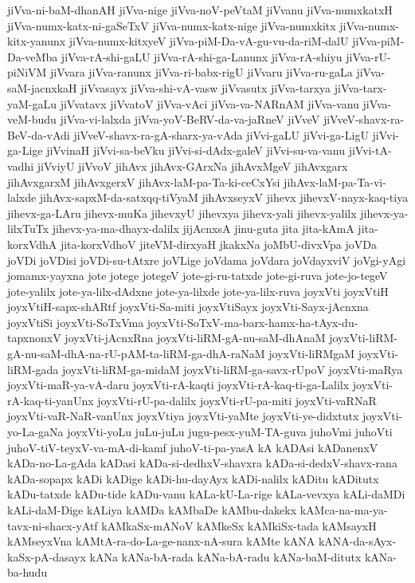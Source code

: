 {jiVva-ni-baM-dhanAH
jiVva-nige
jiVva-noV-peVtaM
jiVvanu
jiVva-numxkatxH
jiVva-numx-katx-ni-gaSeTxV
jiVva-numx-katx-nige
jiVva-numxkitx
jiVva-numx-kitx-yanunx
jiVva-numx-kitxyeV
jiVva-piM-Da-vA-gu-vu-da-riM-dalU
jiVva-piM-Da-veMba
jiVva-rA-shi-gaLU
jiVva-rA-shi-ga-Lanunx
jiVva-rA-shiyu
jiVva-rU-piNiVM
jiVvara
jiVva-ranunx
jiVva-ri-babx-rigU
jiVvaru
jiVva-ru-gaLa
jiVva-saM-jacnxkaH
jiVvasayx
jiVva-shi-vA-vasw
jiVvasutx
jiVva-tarxya
jiVva-tarx-yaM-gaLu
jiVvatavx
jiVvatoV
jiVva-vAci
jiVva-va-NARnAM
jiVva-vanu
jiVva-veM-budu
jiVva-vi-lalxda
jiVva-yoV-BeRV-da-va-jaRneV
jiVveV
jiVveV-shavx-ra-BeV-da-vAdi
jiVveV-shavx-ra-gA-sharx-ya-vAda
jiVvi-gaLU
jiVvi-ga-LigU
jiVvi-ga-Lige
jiVvinaH
jiVvi-sa-beVku
jiVvi-si-dAdx-galeV
jiVvi-su-va-vanu
jiVvi-tA-vadhi
jiVviyU
jiVvoV
jihAvx
jihAvx-GArxNa
jihAvxMgeV
jihAvxgarx
jihAvxgarxM
jihAvxgerxV
jihAvx-laM-pa-Ta-ki-ceCxYsi
jihAvx-laM-pa-Ta-vi-lalxde
jihAvx-sapxM-da-satxqq-tiVyaM
jihAvxseyxV
jihevx
jihevxV-nayx-kaq-tiya
jihevx-ga-LAru
jihevx-muKa
jihevxyU
jihevxya
jihevx-yali
jihevx-yalilx
jihevx-ya-lilxTuTx
jihevx-ya-ma-dhayx-dalilx
jijAcnxsA
jinu-guta
jita
jita-kAmA
jita-korxVdhA
jita-korxVdhoV
jiteVM-dirxyaH
jkakxNa
joMbU-divxVpa
joVDa
joVDi
joVDisi
joVDi-su-tAtxre
joVLige
joVdama
joVdara
joVdayxviV
joVgi-yAgi
jomamx-yayxna
jote
jotege
jotegeV
jote-gi-ru-tatxde
jote-gi-ruva
jote-jo-tegeV
jote-yalilx
jote-ya-lilx-dAdxne
jote-ya-lilxde
jote-ya-lilx-ruva
joyxVti
joyxVtiH
joyxVtiH-sapx-shARtf
joyxVti-Sa-miti
joyxVtiSayx
joyxVti-Sayx-jAcnxna
joyxVtiSi
joyxVti-SoTxVma
joyxVti-SoTxV-ma-barx-hamx-ha-tAyx-du-tapxnonxV
joyxVti-jAcnxRna
joyxVti-liRM-gA-nu-saM-dhAnaM
joyxVti-liRM-gA-nu-saM-dhA-na-rU-pAM-ta-liRM-ga-dhA-raNaM
joyxVti-liRMgaM
joyxVti-liRM-gada
joyxVti-liRM-ga-midaM
joyxVti-liRM-ga-savx-rUpoV
joyxVti-maRya
joyxVti-maR-ya-vA-daru
joyxVti-rA-kaqti
joyxVti-rA-kaq-ti-ga-Lalilx
joyxVti-rA-kaq-ti-yanUnx
joyxVti-rU-pa-dalilx
joyxVti-rU-pa-miti
joyxVti-vaRNaR
joyxVti-vaR-NaR-vanUnx
joyxVtiya
joyxVti-yaMte
joyxVti-ye-didxtutx
joyxVti-yo-La-gaNa
joyxVti-yoLu
juLu-juLu
jugu-pesx-yuM-TA-guva
juhoVmi
juhoVti
juhoV-tiV-teyxV-va-mA-di-kamf
juhoV-ti-pa-yasA
kA
kADAsi
kADanenxV
kADa-no-La-gAda
kADasi
kADa-si-dedhxV-shavxra
kADa-si-dedxV-shavx-rana
kADa-sopapx
kADi
kADige
kADi-hu-dayAyx
kADi-nalilx
kADitu
kADitutx
kADu-tatxde
kADu-tide
kADu-vanu
kALa-kU-La-rige
kALa-vevxya
kALi-daMDi
kALi-daM-Dige
kALiya
kAMDa
kAMbaDe
kAMbu-dakekx
kAMca-na-ma-ya-tavx-ni-shacx-yAtf
kAMkaSx-mANoV
kAMkeSx
kAMkiSx-tada
kAMsayxH
kAMseyxVna
kAMtA-ra-do-La-ge-nanx-nA-sura
kAMte
kANA
kANA-da-sAyx-kaSx-pA-dasayx
kANa
kANa-bA-rada
kANa-bA-radu
kANa-baM-ditutx
kANa-ba-hudu
}
